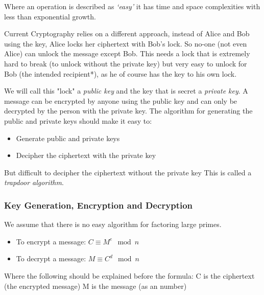 \documentclass{article}
\begin{document}
Where an operation is described as \textit{\lq{}easy\rq{}} it has time and
space complexities with less than exponential growth.

Current Cryptography relies on a different approach, instead of Alice and Bob
using the key, Alice locks her ciphertext with Bob's lock. So no-one (not even
Alice) can unlock the message except Bob. This needs a lock that is extremely
hard to break (to unlock without the private key) but very easy to unlock for
Bob (the intended recipient*), as he of course has the key to his own lock.

We will call this "lock" a \textit{public key} and the key that is secret a
\textit{private key}. A message can be encrypted by anyone using the public key
and can only be decrypted by the person with the private key.
The algorithm for generating the public and private keys should make it easy to:
\begin{itemize}
   \item	Generate public and private keys
   \item Decipher the ciphertext with the private key
\end{itemize}

But difficult to decipher the ciphertext without the private key
This is called a \textit{trapdoor algorithm}.

\subsubsection{Key Generation, Encryption and Decryption}
We assume that there is no easy algorithm for factoring large primes.
\begin{itemize}

   \item To encrypt a message:
      $ C \equiv M^e \mod n $

   \item To decrypt a message:
      $ M \equiv C^d \mod n $

\end{itemize}

Where the following should be explained before the formula:
C is the ciphertext (the encrypted message)
M is the message (as an number)
\end{document}
